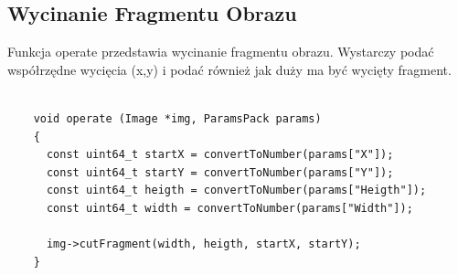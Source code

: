 \documentclass{article}
\begin{document}
\FloatBarrier
\subsection{Wycinanie Fragmentu Obrazu}
Funkcja operate przedstawia wycinanie fragmentu obrazu. Wystarczy podać współrzędne wycięcia (x,y) i podać również jak duży ma być wycięty fragment.
\begin{Verbatim}[frame=single,label=Wycinanie Fragmentu Obrazu (Source Code)]

    void operate (Image *img, ParamsPack params)
    {
      const uint64_t startX = convertToNumber(params["X"]);
      const uint64_t startY = convertToNumber(params["Y"]);
      const uint64_t heigth = convertToNumber(params["Heigth"]);
      const uint64_t width = convertToNumber(params["Width"]);

      img->cutFragment(width, heigth, startX, startY);
    }

\end{Verbatim}
\end{document}
